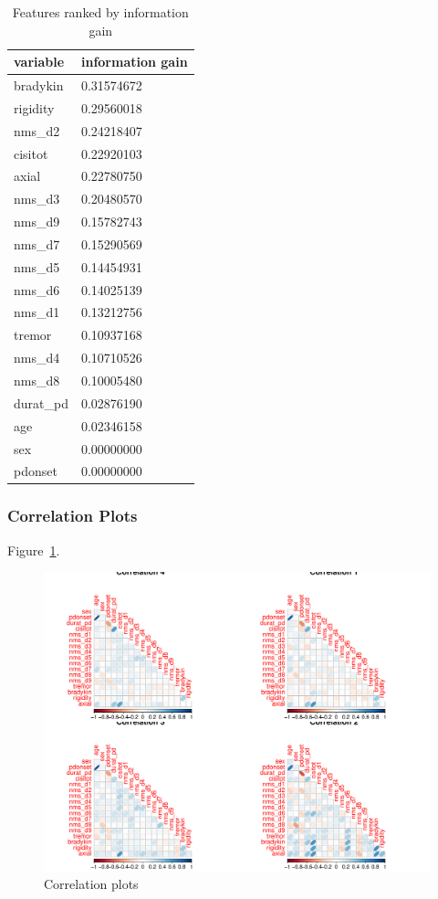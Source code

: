 \documentclass[letterpaper,12pt]{article}
\begin{document}
\begin{table}[h]
  \centering
  \caption{Features ranked by information gain}
  \label{tab:info_gain}
  \begin{tabular}{l|l}
    variable & information gain \\
    \hline
    bradykin      & 0.31574672 \\
    rigidity      & 0.29560018 \\
    nms\_d2      & 0.24218407 \\
    cisitot      & 0.22920103 \\
    axial      & 0.22780750 \\
    nms\_d3      & 0.20480570 \\
    nms\_d9      & 0.15782743 \\
    nms\_d7      & 0.15290569 \\
    nms\_d5      & 0.14454931 \\
    nms\_d6      & 0.14025139 \\
    nms\_d1      & 0.13212756 \\
    tremor      & 0.10937168 \\
    nms\_d4      & 0.10710526 \\
    nms\_d8      & 0.10005480 \\
    durat\_pd      & 0.02876190 \\
    age      & 0.02346158 \\
    sex      & 0.00000000 \\
    pdonset      & 0.00000000 \\
  \end{tabular}
\end{table}

\subsubsection{Correlation Plots}

Figure~\ref{fig:corrplots}.

\begin{figure}[h]
  \centering
  \includegraphics[width=\linewidth]{corrplots.pdf}
  \caption{Correlation plots}
  \label{fig:corrplots}
\end{figure}
\end{document}
